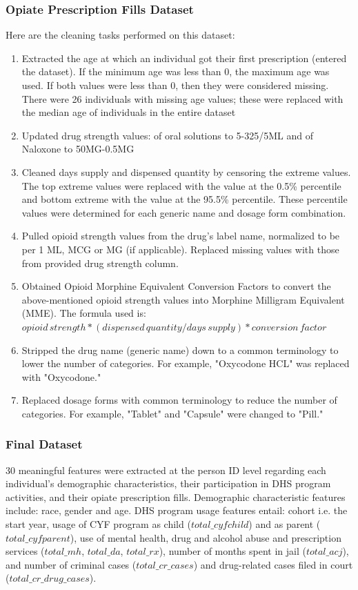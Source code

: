 \documentclass[twoside,10.5pt]{article}
\let\footnote=\endnote
\begin{document}
\subsubsection{Opiate Prescription Fills Dataset}
Here are the cleaning tasks performed on this dataset:
\begin{enumerate}[topsep=0pt,itemsep=-1ex,partopsep=1ex,parsep=1ex]
  \item Extracted the age at which an individual got their first prescription (entered the dataset). If the minimum age was less than 0, the maximum age was used. If both values were less than 0, then they were considered missing. There were 26 individuals with missing age values; these were replaced with the median age of individuals in the entire dataset
  \item Updated drug strength values: of oral solutions to 5-325/5ML and of Naloxone to 50MG-0.5MG
  \item Cleaned days supply and dispensed quantity by censoring the extreme values. The top extreme values were replaced with the value at the 0.5\% percentile and bottom extreme with the value at the 95.5\% percentile. These percentile values were determined for each generic name and dosage form combination. 
  \item Pulled opioid strength values from the drug's label name, normalized to be per 1 ML, MCG or MG (if applicable). Replaced missing values with those from provided drug strength column. 
  \item Obtained Opioid Morphine Equivalent Conversion Factors\footnote{\cite{CMS}} to convert the above-mentioned opioid strength values into Morphine Milligram Equivalent (MME). The formula used is: 
  $opioid\,strength * (dispensed\,quantity / days\,supply) * conversion\,factor$
  \item Stripped the drug name (generic name) down to a common terminology to lower the number of categories. For example, "Oxycodone HCL" was replaced with "Oxycodone."
  \item Replaced dosage forms with common terminology to reduce the number of categories. For example, "Tablet" and "Capsule" were changed to "Pill."
\end{enumerate}

\subsubsection{Final Dataset}
30 meaningful features were extracted at the person ID level regarding each individual's demographic characteristics, their participation in DHS program activities, and their opiate prescription fills. Demographic characteristic features include: race, gender and age. DHS program usage features entail: cohort i.e. the start year, usage of CYF program as child ($total\_cyfchild$) and as parent ($total\_cyfparent$), use of mental health, drug and alcohol abuse and prescription services ($total\_mh$, $total\_da$, $total\_rx$), number of months spent in jail ($total\_acj$), and number of criminal cases ($total\_cr\_cases$) and drug-related cases filed in court ($total\_cr\_drug\_cases$). \\
\end{document}
